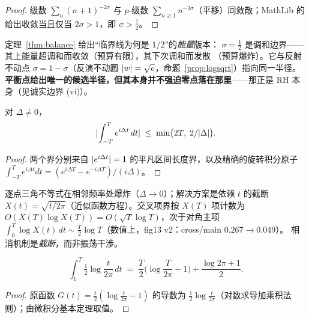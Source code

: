 \begin{proof}
级数 $\sum_n (n+1)^{-2\sigma}$ 与 $p$-级数
$\sum_{n\geq1} n^{-2\sigma}$（平移）同敛散；MathLib 的 
给出收敛当且仅当 $2\sigma>1$，即 $\sigma>\tfrac12$。
\end{proof}

\begin{remark}\label{remark:balance}
定理~\ref{thm:balance} 给出“临界线为何是 $1/2$”的\emph{能量}版本：
$\sigma=\tfrac12$ 是调和边界——其上能量超调和而收敛（预算有限），其下次调和而发散
（预算爆炸）。它与反射不动点 $\sigma=1-\sigma$（反演不动圆
$\lvert w\rvert=\sqrt{e}$，命题~\ref{prop:logsqrt}）指向同一半径。
\textbf{平衡点给出唯一的候选半径，但其本身并不强迫零点落在那里}——那正是 RH
本身（见诚实边界 (vi)）。
\end{remark}

\begin{theorem}
\label{thm:crossmin}
对 $\Delta\neq 0$，
\[
  \lvert \int_{-T}^{T} e^{i\Delta t}\,dt\rvert \;\leq\; \min\!\big(2T,\; 2/\lvert \Delta\rvert\big) .
\]
\end{theorem}

\begin{proof}
两个界分别来自 $\lvert e^{i\Delta t}\rvert=1$ 的平凡区间长度界，以及精确的旋转积分原子
$\int_{-T}^{T}e^{i\Delta t}dt=(e^{i\Delta T}-e^{-i\Delta T})/(i\Delta)$。
\end{proof}

\begin{remark}\label{remark:cutoff}
逐点三角不等式在相邻频率处爆炸（$\Delta\to 0$）；解决方案是依赖 $t$
的截断 $X(t)=\sqrt{t/2\pi}$（近似函数方程）。交叉项界按 $X(T)$ 项计数为
$O(X(T)\log X(T))=O(\sqrt{T}\log T)$，次于对角主项 $\int_0^T \log X(t)\,dt\sim
\tfrac{T}{2}\log T$（数值上，fig13 v2：cross/main $0.267\to0.049$）。
相消机制是\emph{截断}，而非振荡干涉。
\end{remark}

\begin{theorem}
\label{thm:diagint}
\[
  \int_{1}^{T} \tfrac12 \log \frac{t}{2\pi}\,dt
    \;=\; \frac{T}{2}\Big(\log\frac{T}{2\pi}-1\Big) + \frac{\log 2\pi+1}{2} .
\]
\end{theorem}

\begin{proof}
原函数 $G(t)=\tfrac{t}{2}(\log\frac{t}{2\pi}-1)$ 的导数为
$\tfrac12\log\frac{t}{2\pi}$（对数求导加乘积法则）；由微积分基本定理取值。
\end{proof}

